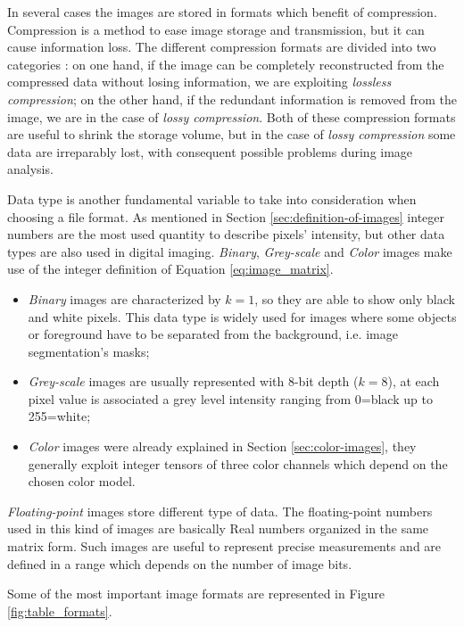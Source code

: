 \documentclass[../main.tex]{subfiles}
\begin{document}
In several cases the images are stored in formats which benefit of compression. Compression is a method to ease image storage and transmission, but it can cause information loss. The different compression formats are divided into two categories \cite{digital_processing_matlab}:
on one hand, if the image can be completely reconstructed from the compressed data without losing information, we are exploiting \textit{lossless compression}; on the other hand, if the redundant information is removed from the image, we are in the case of \textit{lossy compression}.
Both of these compression formats are useful to shrink the storage volume, but in the case of \textit{lossy compression} some data are irreparably lost, with consequent possible problems during image analysis.

Data type is another fundamental variable to take into consideration when choosing a file format. 
As mentioned in Section \ref{sec:definition-of-images} integer numbers are the most used quantity to describe pixels' intensity, but other data types are also used in digital imaging.
\textit{Binary}, \textit{Grey-scale} and \textit{Color} images make use of the integer definition of Equation \ref{eq:image_matrix}.
\begin{itemize}
    \item \textit{Binary} images are  characterized by $k=1$, so they are able to show only black and white pixels.
    This data type is widely used for images where some objects or foreground have to be separated from the background, i.e. image segmentation's masks;
    \item \textit{Grey-scale} images are usually represented with 8-bit depth ($k=8$), at each pixel value is associated a grey level intensity ranging from 0=black up to 255=white;
    \item \textit{Color} images were already explained in Section \ref{sec:color-images}, they generally exploit integer tensors of three color channels which depend on the chosen color model.
\end{itemize}
\textit{Floating-point} images store different type of data. 
The floating-point numbers used in this kind of images are basically Real numbers organized in the same matrix form. 
Such images are useful to represent precise measurements and are defined in a range which depends on the number of image bits.

Some of the most important image formats are represented in Figure \ref{fig:table_formats}.
\end{document}
